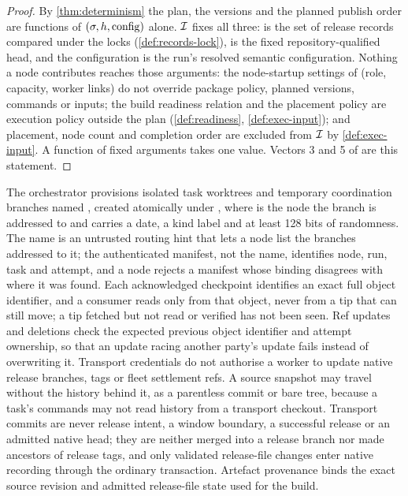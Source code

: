 \begin{proof}
By \cref{thm:determinism} the plan, the versions and the planned publish
order are functions of $(\sigma, h, \mathrm{config})$ alone. $\mathcal{I}$ fixes all
three: \st{} is the set of release records compared under the locks
(\cref{def:records-lock}), \Head{} is the fixed repository-qualified head, and
the configuration is the run's resolved semantic configuration. Nothing a node
contributes reaches those arguments: the node-startup settings of 
(role, capacity, worker links) do not override package policy, planned
versions, commands or inputs; the build readiness relation and the placement
policy are execution policy outside the plan (\cref{def:readiness},
\cref{def:exec-input}); and placement, node count and completion order are
excluded from $\mathcal{I}$ by \cref{def:exec-input}. A function of fixed arguments
takes one value. Vectors 3 and 5 of  are this statement.
\end{proof}

\begin{definition}
\label{def:exec-branches}
The orchestrator provisions isolated task worktrees and temporary coordination
branches named , created atomically under
, where  is the node the branch is addressed to
and  carries a date, a kind label and at least 128 bits of
randomness. The name is an untrusted routing hint that lets a node list the
branches addressed to it; the authenticated manifest, not the name,
identifies node, run, task and attempt, and a node rejects a manifest whose
binding disagrees with where it was found. Each acknowledged checkpoint
identifies an exact full object identifier, and a consumer reads only from
that object, never from a tip that can still move; a tip fetched but not read
or verified has not been seen. Ref updates and deletions check the expected
previous object identifier and attempt ownership, so that an update racing
another party's update fails instead of overwriting it. Transport credentials
do not authorise a worker to update native release branches, tags or fleet
settlement refs. A source snapshot may travel without the history behind it,
as a parentless commit or bare tree, because a task's commands may not read
history from a transport checkout. Transport commits are never release intent,
a window boundary, a successful release or an admitted native head; they are
neither merged into a release branch nor made ancestors of release tags, and
only validated release-file changes enter native recording through the
ordinary transaction. Artefact provenance binds the exact source revision and
admitted release-file state used for the build.
\end{definition}


